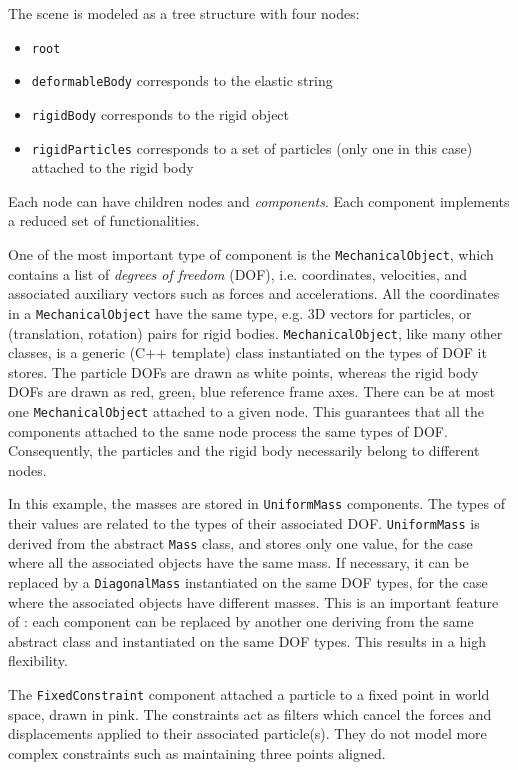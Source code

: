The scene is modeled as a tree structure with four nodes:
\begin{itemize}
 \item \texttt{root}
 \item \texttt{deformableBody} corresponds to the elastic string
 \item \texttt{rigidBody} corresponds to the rigid object
 \item \texttt{rigidParticles} corresponds to a set of particles (only one in this case) attached to the rigid body
\end{itemize}
Each node can have children nodes and \textit{components}. 
Each component implements a reduced set of functionalities.


One of the most important type of component is the \texttt{MechanicalObject}, which contains a list of \textit{degrees of freedom} (DOF), i.e. coordinates, velocities, and associated auxiliary vectors such as forces and accelerations.
All the coordinates in a \texttt{MechanicalObject} have the same type, e.g. 3D vectors for particles, or (translation, rotation) pairs for rigid bodies. 
\texttt{MechanicalObject}, like many other \sofa classes, is a generic (C++ template) class instantiated on the types of DOF it stores.
The particle DOFs are drawn as white points, whereas the rigid body DOFs are drawn as red, green, blue reference frame axes.
There can be at most one \texttt{MechanicalObject} attached to a given node. 
This guarantees that all the components attached to the same node process the same types of DOF. 
Consequently, the particles and the rigid body necessarily belong to different nodes.

In this example, the masses are stored in \texttt{UniformMass} components.
The types of their values are related to the types of their associated DOF.
\texttt{UniformMass} is derived from the abstract \texttt{Mass} class, and stores only one value, for the case where all the associated objects have the same mass. 
If necessary, it can be replaced by a \texttt{DiagonalMass} instantiated on the same DOF types, for the case where the associated objects have different masses. 
This is an important feature of \sofa: each component can be replaced by another one deriving from the same abstract class and instantiated on the same DOF types. 
This results in a high flexibility.

The \texttt{FixedConstraint} component attached a particle to a fixed point in world space, drawn in pink. 
The constraints act as filters which cancel the forces and displacements applied to their associated particle(s). 
They do not model more complex constraints such as maintaining three points aligned.


